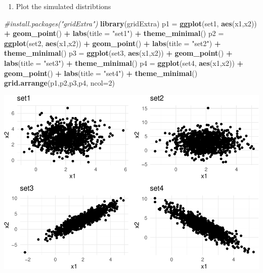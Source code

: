 \documentclass[]{article}
\newenvironment{Shaded}{\begin{snugshade}}{\end{snugshade}}
\newcommand{\KeywordTok}[1]{\textcolor[rgb]{0.13,0.29,0.53}{\textbf{#1}}}
\newcommand{\DataTypeTok}[1]{\textcolor[rgb]{0.13,0.29,0.53}{#1}}
\newcommand{\DecValTok}[1]{\textcolor[rgb]{0.00,0.00,0.81}{#1}}
\newcommand{\StringTok}[1]{\textcolor[rgb]{0.31,0.60,0.02}{#1}}
\newcommand{\CommentTok}[1]{\textcolor[rgb]{0.56,0.35,0.01}{\textit{#1}}}
\newcommand{\OperatorTok}[1]{\textcolor[rgb]{0.81,0.36,0.00}{\textbf{#1}}}
\newcommand{\NormalTok}[1]{#1}
\providecommand{\tightlist}{%
  \setlength{\itemsep}{0pt}\setlength{\parskip}{0pt}}
\begin{document}
\begin{enumerate}
\def\labelenumi{\alph{enumi})}
\setcounter{enumi}{1}
\tightlist
\item
  Plot the simulated distribtions
\end{enumerate}

\begin{Shaded}
\begin{Highlighting}[]
\CommentTok{#install.packages("gridExtra")}
\KeywordTok{library}\NormalTok{(gridExtra)}
\NormalTok{p1 =}\StringTok{ }\KeywordTok{ggplot}\NormalTok{(set1, }\KeywordTok{aes}\NormalTok{(x1,x2)) }\OperatorTok{+}\StringTok{ }\KeywordTok{geom_point}\NormalTok{() }\OperatorTok{+}\StringTok{ }\KeywordTok{labs}\NormalTok{(}\DataTypeTok{title =} \StringTok{"set1"}\NormalTok{) }\OperatorTok{+}\StringTok{ }\KeywordTok{theme_minimal}\NormalTok{()}
\NormalTok{p2 =}\StringTok{ }\KeywordTok{ggplot}\NormalTok{(set2, }\KeywordTok{aes}\NormalTok{(x1,x2)) }\OperatorTok{+}\StringTok{ }\KeywordTok{geom_point}\NormalTok{() }\OperatorTok{+}\StringTok{ }\KeywordTok{labs}\NormalTok{(}\DataTypeTok{title =} \StringTok{"set2"}\NormalTok{) }\OperatorTok{+}\StringTok{ }\KeywordTok{theme_minimal}\NormalTok{()}
\NormalTok{p3 =}\StringTok{ }\KeywordTok{ggplot}\NormalTok{(set3, }\KeywordTok{aes}\NormalTok{(x1,x2)) }\OperatorTok{+}\StringTok{ }\KeywordTok{geom_point}\NormalTok{() }\OperatorTok{+}\StringTok{ }\KeywordTok{labs}\NormalTok{(}\DataTypeTok{title =} \StringTok{"set3"}\NormalTok{) }\OperatorTok{+}\StringTok{ }\KeywordTok{theme_minimal}\NormalTok{()}
\NormalTok{p4 =}\StringTok{ }\KeywordTok{ggplot}\NormalTok{(set4, }\KeywordTok{aes}\NormalTok{(x1,x2)) }\OperatorTok{+}\StringTok{ }\KeywordTok{geom_point}\NormalTok{() }\OperatorTok{+}\StringTok{ }\KeywordTok{labs}\NormalTok{(}\DataTypeTok{title =} \StringTok{"set4"}\NormalTok{) }\OperatorTok{+}\StringTok{ }\KeywordTok{theme_minimal}\NormalTok{()}
\KeywordTok{grid.arrange}\NormalTok{(p1,p2,p3,p4, }\DataTypeTok{ncol=}\DecValTok{2}\NormalTok{)}
\end{Highlighting}
\end{Shaded}

\includegraphics{RecEx2-sol_files/figure-latex/unnamed-chunk-11-1.pdf}
\end{document}
